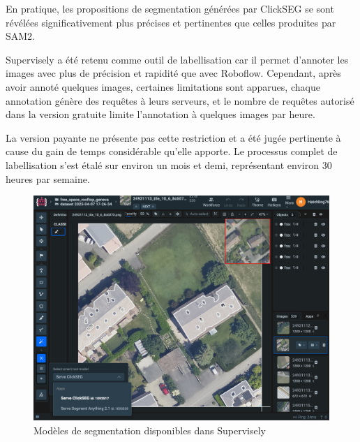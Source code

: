En pratique, les propositions de segmentation générées par ClickSEG se sont révélées significativement plus précises et pertinentes que celles produites par SAM2.

Supervisely a été retenu comme outil de labellisation car il permet d'annoter les images avec plus de précision et rapidité que avec Roboflow. Cependant, après avoir annoté quelques images, certaines limitations sont apparues, chaque annotation génère des requêtes à leurs serveurs, et le nombre de requêtes autorisé dans la version gratuite limite l'annotation à quelques images par heure.

La version payante ne présente pas cette restriction et a été jugée pertinente à cause du gain de temps considérable qu'elle apporte. Le processus complet de labellisation s'est étalé sur environ un mois et demi, représentant environ 30 heures par semaine.

\begin{figure}[H]
    \centering
    \includegraphics[width=0.97\linewidth]{02-main/figures/ch3/ch3_labellisation_01_outils_03_supervisely_modeles.png}
    \caption{Modèles de segmentation disponibles dans Supervisely}
    \label{fig:ch3_labellisation_01_outils_03_supervisely_modeles}
\end{figure}

